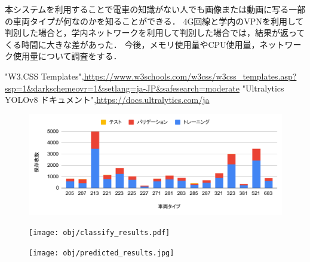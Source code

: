\begin{multicols*}{2}
本システムを利用することで電車の知識がない人でも画像または動画に写る一部の車両タイプが何なのかを知ることができる．
4G回線と学内のVPNを利用して判別した場合と，学内ネットワークを利用して判別した場合では，結果が返ってくる時間に大きな差があった．
今後，メモリ使用量やCPU使用量，ネットワーク使用量について調査をする．

\begin{thebibliography}{99}

	
	"W3.CSS Templates",\url{https://www.w3schools.com/w3css/w3css_templates.asp?ssp=1&darkschemeovr=1&setlang=ja-JP&safesearch=moderate}
	"Ultralytics YOLOv8 ドキュメント",\url{https://docs.ultralytics.com/ja}
\end{thebibliography}


\begin{figure}
	\centering
	\includegraphics[width=\linewidth]{obj/chart2.pdf}
\end{figure}


\begin{figure}
	\centering
	\texttt{[image: obj/classify\_results.pdf]}
\end{figure}


\begin{figure}
	\centering
	\texttt{[image: obj/predicted\_results.jpg]}
\end{figure}



\end{multicols*}
